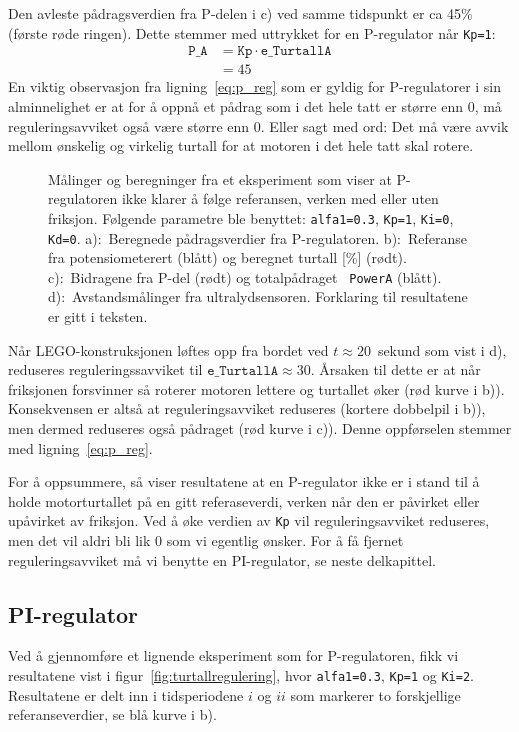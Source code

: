 Den avleste pådragsverdien fra P-delen 
i c) ved samme tidspunkt er ca 45\% (første røde ringen). 
Dette  stemmer med uttrykket for en P-regulator når {\tt Kp=1}: 
\begin{align}
  \mathtt{P\_{A}} & = \mathtt{Kp} \cdot \mathtt{e\_{TurtallA}} \label{eq:p_reg}\\
                          & =  45
\end{align}
En viktig observasjon fra ligning~\eqref{eq:p_reg} som er gyldig for
P-regulatorer i sin alminnelighet er at for å oppnå et pådrag som i
det hele tatt er større enn 0, må reguleringsavviket også være større
enn 0.  Eller sagt med ord: Det må være
avvik mellom ønskelig og virkelig turtall for at motoren i
det hele tatt skal rotere.

\begin{figure}[H]
  \centering
  \hspace*{0mm}
  \caption{Målinger og beregninger fra et eksperiment som viser
    at P-regulatoren ikke klarer å følge referansen, verken med eller
    uten friksjon. Følgende
    parametre ble benyttet: {\tt alfa1=0.3}, {\tt Kp=1}, {\tt Ki=0},
    {\tt Kd=0}.
    a):~Beregnede pådragsverdier fra P-regulatoren. 
    b):~Referanse fra potensiometerert (blått) og beregnet
    turtall [\%] (rødt). 
    c):~Bidragene fra P-del (rødt) og totalpådraget {\tt
      PowerA} (blått). 
    d):~Avstandsmålinger fra ultralydsensoren.
    Forklaring
    til resultatene er gitt i teksten.} 
  \label{fig:P_reg}
\end{figure}


Når LEGO-konstruksjonen
løftes opp fra bordet ved $t{\approx}20$~sekund som vist i d),
reduseres reguleringssavviket til $\mathtt{e\_TurtallA}{\approx}30$. 
Årsaken til dette er at når 
friksjonen forsvinner så roterer motoren lettere og 
turtallet øker (rød kurve i b)).  
Konsekvensen er altså at reguleringsavviket 
reduseres (kortere dobbelpil i b)), men dermed reduseres også pådraget
(rød kurve i c)).  Denne oppførselen stemmer med ligning~\eqref{eq:p_reg}.

For å oppsummere, så viser resultatene 
at en P-regulator ikke er i stand til å holde
motorturtallet på en gitt referaseverdi, verken når den er påvirket eller
upåvirket av friksjon. Ved å øke verdien av {\tt Kp} vil
reguleringsavviket reduseres, men det vil aldri bli lik 0 som vi egentlig
ønsker. For å få fjernet reguleringsavviket må vi benytte en
PI-regulator, se neste delkapittel.

\subsection{PI-regulator}
Ved å gjennomføre et lignende eksperiment som for P-regulatoren, fikk vi 
resultatene vist i figur~\ref{fig:turtallregulering}, hvor
{\tt alfa1=0.3}, {\tt Kp=1} og {\tt Ki=2}. Resultatene
er delt inn i tidsperiodene  $i$ og $ii$ som markerer to
forskjellige referanseverdier, se blå kurve i b). 

